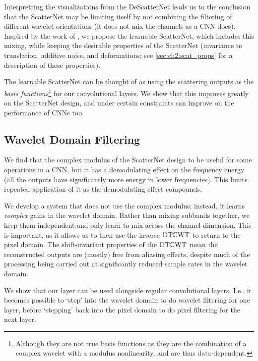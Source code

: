 Interpretring the visualizations from the DeScatterNet leads us to the conclusion
that the ScatterNet may be limiting itself by not
combining the filtering of different wavelet orientations (it does not mix the
channels as a CNN does). Inspired by the work of \cite{qiu_dcfnet:_2018}, we
propose the learnable ScatterNet, which includes this mixing, while keeping the
desirable properties of the ScatterNet (invariance to translation, additive noise, 
and deformations; see \autoref{sec:ch2:scat_props} for a description of these properties).

The learnable ScatterNet can be thought of as using the scattering outputs as
the \emph{basis functions}\footnote{Although they are not true basis functions
as they are the combination of a complex wavelet with a modulus nonlinearity,
and are thus data-dependent.} for our convolutional layers. We show that this
improves greatly on the ScatterNet design, and under certain constraints can
improve on the performance of CNNs too.

\subsection{Wavelet Domain Filtering}
We find that the complex modulus of the ScatterNet design to be useful for some
operations in a CNN, but it has a demodulating effect on the frequency energy
(all the outputs have significantly more energy in lower frequencies). This
limits repeated application of it as the demodulating effect compounds.

We develop a system that does not use the complex modulus; instead, it
learns \emph{complex} gains in the wavelet domain.
Rather than mixing subbands together, we keep them independent and only learn to
mix across the channel dimension. This is important, as it allows us to then use the inverse
$\mathrm{DT}\mathbb{C}\mathrm{WT}$ to return to the pixel domain. The shift-invariant properties of the $\mathrm{DT}\mathbb{C}\mathrm{WT}$ mean the
reconstructed outputs are (mostly) free from aliasing effects, despite much of
the processing being carried out at significantly reduced sample rates in the
wavelet domain.

We show that our layer can be used alongside regular convolutional
layers. I.e., it becomes possible to `step' into the wavelet domain to do
wavelet filtering for one layer, before `stepping' back into the pixel domain to
do pixel filtering for the next layer.

